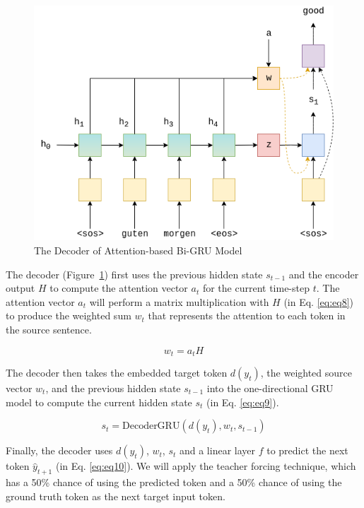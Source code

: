 \begin{figure}[h]
	\centering
	\includegraphics[scale=0.7]{../images/seq2seq_decoder_attention.png}
    \caption{The Decoder of Attention-based Bi-GRU Model}
	\label{fig:seq2seq_decoder}
\end{figure}

The decoder (Figure~\ref{fig:seq2seq_decoder}) first uses the previous hidden state $s_{t-1}$ and the encoder output $H$ to compute the attention vector $a_t$ for the current time-step $t$. The attention vector $a_t$ will perform a matrix multiplication with $H$ (in Eq. \ref{eq:eq8}) to produce the weighted sum $w_t$ that represents the attention to each token in the source sentence.

\begin{equation}
    w_t = a_tH \label{eq:eq8}
\end{equation}

The decoder then takes the embedded target token $d(y_t)$, the weighted source vector $w_t$, and the previous hidden state $s_{t-1}$ into the one-directional GRU model to compute the current hidden state $s_t$ (in Eq. \ref{eq:eq9}).

\begin{equation}
    s_t = \text{DecoderGRU}(d(y_t), w_t, s_{t-1}) \label{eq:eq9}
\end{equation}

Finally, the decoder uses $d(y_t)$, $w_t$, $s_t$ and a linear layer $f$ to predict the next token $\hat{y}_{t+1}$ (in Eq. \ref{eq:eq10}). We will apply the teacher forcing technique, which has a 50\% chance of using the predicted token and a 50\% chance of using the ground truth token as the next target input token.

